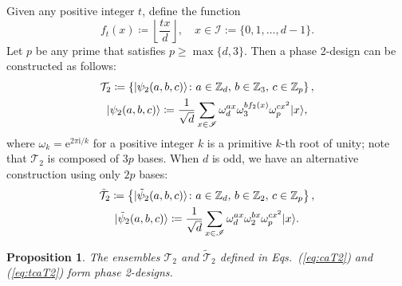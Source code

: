 \documentclass[aps,pra,twocolumn,nofootinbib,superscriptaddress,10pt]{revtex4-2}
\newtheorem{proposition}{Proposition}
\DeclarePairedDelimiter{\ket}{\lvert}{\rangle}
\newcommand{\bbZ}{\mathbb{Z}}
\newcommand{\caT}{\mathcal{T}}
\newcommand{\rme}{\mathrm{e}}
\newcommand{\rmi}{\mathrm{i}}
\newcommand{\scrI}{\mathscr{I}}
\newcommand{\tcaT}{\tilde{\mathcal{T}}}
\newcommand{\tpsi}{\tilde{\psi}}
\newcommand{\eqsref}[2]{Eqs.~(\ref{#1}) and (\ref{#2})}
\begin{document}
Given any positive integer $t$, define the function 
\begin{equation}
	f_t(x)\coloneqq \left\lfloor \frac{tx}{d}\right\rfloor,\quad x\in \scrI:= \{0,1,\ldots,d-1\}.
\end{equation}
Let $p$ be any prime that satisfies $p\geq\max\{d,3\}$. Then a phase 2-design can be constructed as follows:
\begin{equation}\label{eq:caT2}
	\begin{gathered}
		\caT_2\coloneqq \left\{\ket{\psi_2(a,b,c)} \colon a\in \bbZ_d,\, b\in \bbZ_3,\, c\in \bbZ_p\right\},\\
		\ket{\psi_2(a,b,c)}\coloneqq \frac{1}{\sqrt{d}} \sum_{x\in \scrI} \omega_d^{ax}\omega_3^{bf_2(x)}\omega_p^{cx^2}\ket{x},
	\end{gathered}
\end{equation}
where $\omega_k=\rme^{2\pi\rmi/k}$ for a positive integer $k$ is a primitive $k$-th root of unity;
note that $\caT_2$ is composed of $3p$ bases. When $d$ is odd, we have an alternative construction using only $2p$ bases:
\begin{equation}\label{eq:tcaT2}
	\begin{gathered}
		\tcaT_2\coloneqq\left\{\ket{\tpsi_2(a,b,c)} \colon a\in \bbZ_d,\, b\in \bbZ_2,\, c\in \bbZ_p\right\},\\
		\ket{\tpsi_2(a,b,c)}\coloneqq\frac{1}{\sqrt{d}} \sum_{x\in \scrI} \omega_d^{ax}\omega_2^{bx}\omega_p^{cx^2}\ket{x}.
	\end{gathered}
\end{equation}
\begin{proposition}\label{pro:Phase2design}
	The ensembles $\caT_2$ and $\tcaT_2$ defined in \eqsref{eq:caT2}{eq:tcaT2} form phase 2-designs.
\end{proposition}
\end{document}
